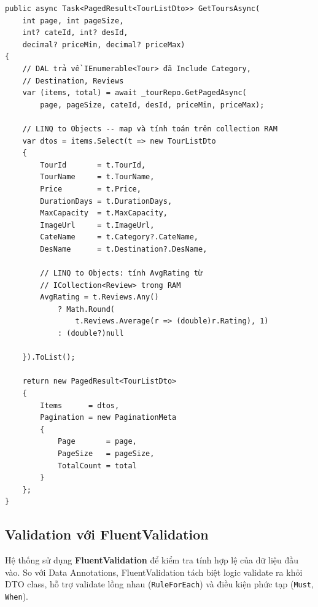 \begin{lstlisting}[style=csharp,
  caption={LINQ to Objects trong TourService},
  label={lst:linqobj}]
public async Task<PagedResult<TourListDto>> GetToursAsync(
    int page, int pageSize,
    int? cateId, int? desId,
    decimal? priceMin, decimal? priceMax)
{
    // DAL trả về IEnumerable<Tour> đã Include Category,
    // Destination, Reviews
    var (items, total) = await _tourRepo.GetPagedAsync(
        page, pageSize, cateId, desId, priceMin, priceMax);

    // LINQ to Objects -- map và tính toán trên collection RAM
    var dtos = items.Select(t => new TourListDto
    {
        TourId       = t.TourId,
        TourName     = t.TourName,
        Price        = t.Price,
        DurationDays = t.DurationDays,
        MaxCapacity  = t.MaxCapacity,
        ImageUrl     = t.ImageUrl,
        CateName     = t.Category?.CateName,
        DesName      = t.Destination?.DesName,

        // LINQ to Objects: tính AvgRating từ
        // ICollection<Review> trong RAM
        AvgRating = t.Reviews.Any()
            ? Math.Round(
                t.Reviews.Average(r => (double)r.Rating), 1)
            : (double?)null

    }).ToList();  

    return new PagedResult<TourListDto>
    {
        Items      = dtos,
        Pagination = new PaginationMeta
        {
            Page       = page,
            PageSize   = pageSize,
            TotalCount = total
        }
    };
}
\end{lstlisting}

\subsection{Validation với FluentValidation}\label{sub3.3.4}

Hệ thống sử dụng \textbf{FluentValidation} để kiểm tra tính
hợp lệ của dữ liệu đầu vào. So với Data Annotations,
FluentValidation tách biệt logic validate ra khỏi DTO class,
hỗ trợ validate lồng nhau (\texttt{RuleForEach}) và điều kiện
phức tạp (\texttt{Must}, \texttt{When}).

